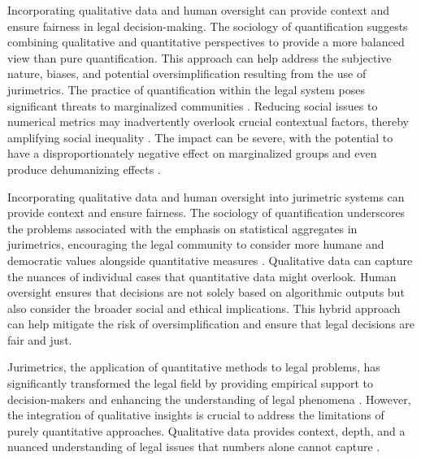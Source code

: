Incorporating qualitative data and human oversight can provide context and ensure fairness in legal decision-making. The sociology of quantification suggests combining qualitative and quantitative perspectives to provide a more balanced view than pure quantification. This approach can help address the subjective nature, biases, and potential oversimplification resulting from the use of jurimetrics. The practice of quantification within the legal system poses significant threats to marginalized communities \cite{10.1057/s41599-020-00557-0,10.1057/s41599-020-0396-5}. Reducing social issues to numerical metrics may inadvertently overlook crucial contextual factors, thereby amplifying social inequality \cite{10.1057/s41599-020-00557-0,10.1057/s41599-020-0396-5}. The impact can be severe, with the potential to have a disproportionately negative effect on marginalized groups and even produce dehumanizing effects \cite{10.1057/s41599-020-0396-5,10.1057/s41599-020-00557-0}.

Incorporating qualitative data and human oversight into jurimetric systems can provide context and ensure fairness. The sociology of quantification underscores the problems associated with the emphasis on statistical aggregates in jurimetrics, encouraging the legal community to consider more humane and democratic values alongside quantitative measures \cite{10.1007/s11186-021-09453-1,10.5040/9781350220645}. Qualitative data can capture the nuances of individual cases that quantitative data might overlook. Human oversight ensures that decisions are not solely based on algorithmic outputs but also consider the broader social and ethical implications. This hybrid approach can help mitigate the risk of oversimplification and ensure that legal decisions are fair and just.

Jurimetrics, the application of quantitative methods to legal problems, has significantly transformed the legal field by providing empirical support to decision-makers and enhancing the understanding of legal phenomena \cite{10.3390/fi9040068,10.5040/9781350220645,de2010jurimetrics}. However, the integration of qualitative insights is crucial to address the limitations of purely quantitative approaches. Qualitative data provides context, depth, and a nuanced understanding of legal issues that numbers alone cannot capture \cite{10.1590/data.2022.65.3.267,10.1057/s41599-020-0396-5}.

